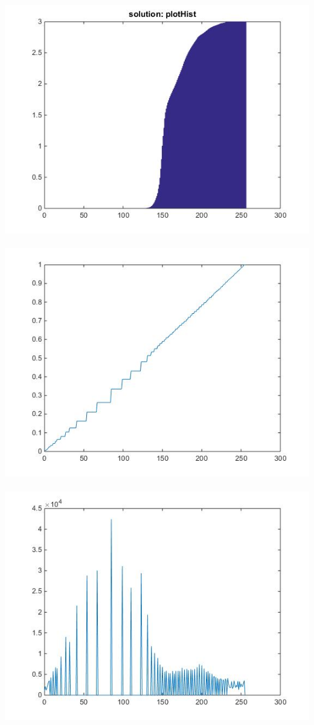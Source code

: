 {{    \\ \ \\
    \includegraphics[scale=0.6]{images/3b1.jpg}
    \\ \ \\
    \includegraphics[scale=0.6]{images/3b2.jpg}
    \\ \ \\
    \includegraphics[scale=0.6]{images/3b3.jpg}
}}
